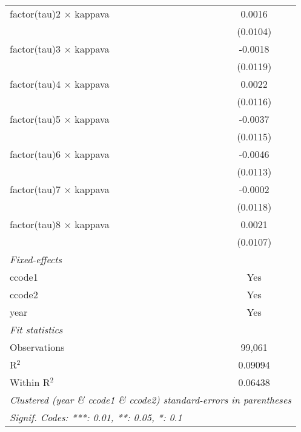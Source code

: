 \begin{tabular}{lc}
   factor(tau)2 $\times$ kappava   & 0.0016\\   
                                   & (0.0104)\\   
   factor(tau)3 $\times$ kappava   & -0.0018\\   
                                   & (0.0119)\\   
   factor(tau)4 $\times$ kappava   & 0.0022\\   
                                   & (0.0116)\\   
   factor(tau)5 $\times$ kappava   & -0.0037\\   
                                   & (0.0115)\\   
   factor(tau)6 $\times$ kappava   & -0.0046\\   
                                   & (0.0113)\\   
   factor(tau)7 $\times$ kappava   & -0.0002\\   
                                   & (0.0118)\\   
   factor(tau)8 $\times$ kappava   & 0.0021\\   
                                   & (0.0107)\\   
   \midrule
   \emph{Fixed-effects}\\
   ccode1                          & Yes\\  
   ccode2                          & Yes\\  
   year                            & Yes\\  
   \midrule
   \emph{Fit statistics}\\
   Observations                    & 99,061\\  
   R$^2$                           & 0.09094\\  
   Within R$^2$                    & 0.06438\\  
   \midrule \midrule
   \multicolumn{2}{l}{\emph{Clustered (year \& ccode1 \& ccode2) standard-errors in parentheses}}\\
   \multicolumn{2}{l}{\emph{Signif. Codes: ***: 0.01, **: 0.05, *: 0.1}}\\
\end{tabular}
\par\endgroup



